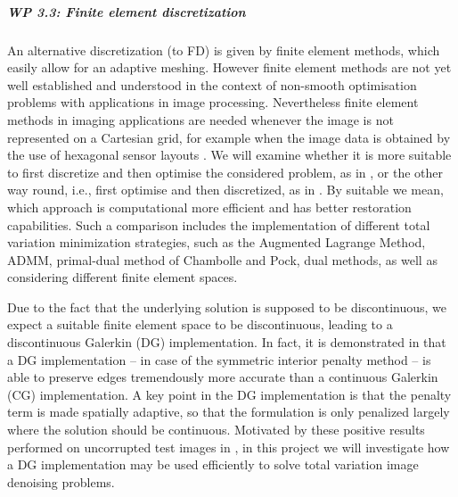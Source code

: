 \documentclass[enabledeprecatedfontcommands,cleardoublepage=empty,headsepline,twoside,11pt,DIV=15,BCOR=12mm,final]{scrartcl}
\begin{document}
 
 \subparagraph{WP 3.3: Finite element discretization}
 
 An alternative discretization (to FD) is given by finite element methods, which easily allow for an adaptive meshing. However finite element methods are not yet well established and understood in the context of non-smooth optimisation problems with applications in image processing. Nevertheless finite element methods in imaging applications are needed whenever the image is not represented on a Cartesian grid, for example when the image data is obtained by the use of hexagonal sensor layouts \cite{CoScGa:16,KnStBoKa:07}.     %
  We will examine whether it is more suitable to first discretize and then optimise the considered problem, as in \cite{HeHeScViWa:19}, or the other way round, i.e., first optimise and then discretized, as in . By suitable we mean, which approach is computational more efficient and has better restoration capabilities. %
  Such a comparison includes the implementation of different total variation minimization strategies, such as the Augmented Lagrange Method, ADMM, primal-dual method of Chambolle and Pock, dual methods, as well as considering different finite element spaces. 

Due to the fact that the underlying solution is supposed to be discontinuous, we expect a suitable finite element space to be discontinuous, leading to a discontinuous Galerkin (DG) implementation. In fact, it is demonstrated in  that a DG implementation -- in case of the symmetric interior penalty method -- is able to preserve edges tremendously more accurate than a continuous Galerkin (CG) implementation. A key point in the DG implementation is that the penalty term is made spatially adaptive, so that the formulation is only penalized largely where the solution should be continuous. Motivated by these positive results performed on uncorrupted test images in , in this project we will investigate how a DG implementation may be used efficiently to solve total variation image denoising problems. 
  
\end{document}

